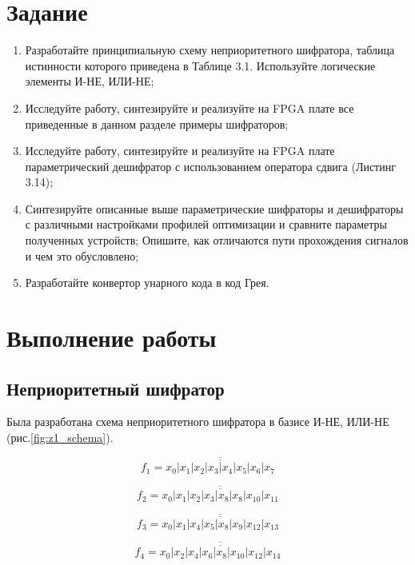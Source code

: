 \documentclass[a4paper,14pt]{article}
\begin{document}

\tableofcontents
\pagebreak
\section{Задание}

\begin{enumerate}
	\item Разработайте принципиальную схему неприоритетного шифратора, таблица истинности
	которого приведена в Таблице 3.1. Используйте логические элементы И-НЕ, ИЛИ-НЕ;
	
	\item Исследуйте работу, синтезируйте и реализуйте на FPGA плате все приведенные в данном
	разделе примеры шифраторов;
	
	\item Исследуйте работу, синтезируйте и реализуйте на FPGA плате параметрический дешифратор
	с использованием оператора сдвига (Листинг 3.14);
	
	\item Синтезируйте описанные выше параметрические шифраторы и дешифраторы с различными
	настройками профилей оптимизации и сравните параметры полученных устройств;
	Опишите, как отличаются пути прохождения сигналов и чем это обусловлено;
	
	\item Разработайте конвертор унарного кода в код Грея.
\end{enumerate}

\section{Выполнение работы}

\subsection{Неприоритетный шифратор}
 
Была разработана схема неприоритетного шифратора в базисе И-НЕ, ИЛИ-НЕ (рис.\ref{fig:z1_schema}).

$$ f_1 = \overline{\overline{x_0 | x_1 | x_2 | x_3 | x_4 | x_5 | x_6 | x_7}} $$

$$ f_2 = \overline{\overline{x_0 | x_1 | x_2 | x_3 | x_8 | x_8 | x_{10} | x_{11}}}$$

$$ f_3 = \overline{\overline{x_0 | x_1 | x_4 | x_5 | x_8 | x_9 | x_{12} | x_13}}$$

$$ f_4 = \overline{\overline{x_0 | x_2 | x_4 | x_6 | x_8 | x_{10} | x_{12} | x_{14}}} $$
\end{document}
